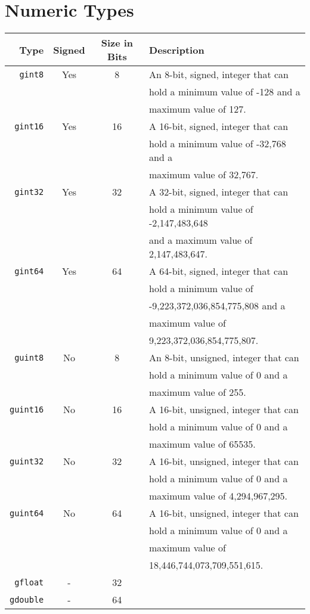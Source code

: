 \section{Numeric Types}

\begin{tabular}{ r | c | c | l }
\hline
Type & Signed & Size in Bits & Description \\
\hline
\verb|gint8| & Yes & 8 &
An 8-bit, signed, integer that can \\
&&& hold a minimum value of -128 and a \\
&&& maximum value of 127. \\
\hline
\verb|gint16| & Yes & 16 &
A 16-bit, signed, integer that can \\
&&& hold a minimum value of -32,768 and a \\
&&& maximum value of 32,767. \\
\hline
\verb|gint32| & Yes & 32 &
A 32-bit, signed, integer that can \\
&&& hold a minimum value of -2,147,483,648 \\
&&& and a maximum value of 2,147,483,647. \\
\hline
\verb|gint64| & Yes & 64 &
A 64-bit, signed, integer that can \\
&&& hold a minimum value of \\
&&& -9,223,372,036,854,775,808 and a \\
&&& maximum value of \\
&&& 9,223,372,036,854,775,807. \\
\hline
\verb|guint8| & No & 8 &
An 8-bit, unsigned, integer that can \\
&&& hold a minimum value of 0 and a \\
&&& maximum value of 255. \\
\hline
\verb|guint16| & No & 16 &
A 16-bit, unsigned, integer that can \\
&&& hold a minimum value of 0 and a \\
&&& maximum value of 65535. \\
\hline
\verb|guint32| & No & 32 &
A 16-bit, unsigned, integer that can \\
&&& hold a minimum value of 0 and a \\
&&& maximum value of 4,294,967,295. \\
\hline
\verb|guint64| & No & 64 &
A 16-bit, unsigned, integer that can \\
&&& hold a minimum value of 0 and a \\
&&& maximum value of \\
&&& 18,446,744,073,709,551,615. \\
\hline
\verb|gfloat| & - & 32 & \\
\hline
\verb|gdouble| & - & 64 & \\
\hline
\end{tabular}

